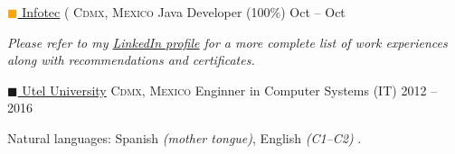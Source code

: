 \documentclass[10pt,a4paper]{article}
\newcommand{\colorsquare}[1]{\textcolor{#1}{$\blacksquare$}}
\begin{document}
\vspace{-1em}

\headedsection
  {\href{https://www.infotec.mx/}{\colorsquare{orange}  Infotec} (}
  {\textsc{Cdmx, Mexico}} {%
  \headedsubsection
    {Java Developer (100\%)}
    {Oct  -- Oct }
    {}
}

\vspace{-0.2em}
\begin{center}
  \emph{\small Please refer to my \href{http://www.linkedin.com/in/sergio-martinez-b70a79177}{LinkedIn profile} for a more complete list of work experiences along with recommendations and certificates.}
\end{center}

\spacedhrule{-0.2em}{-0.4em}


\headedsection
  {\href{https://uteluniversidad.mx/p/utel-formacion?msclkid=1eb53b5cf61218f895775f4eda7ce02f}{\colorsquare{brickred} Utel University}}
  {\textsc{Cdmx, Mexico}} {%
  \headedsubsection
    {Enginner in Computer Systems (IT)}
    {2012 -- 2016}
    {%
    }
}



\spacedhrule{0.5em}{-0.4em}



\vspace{0.5em}
\inlineheadsection
  {Natural languages:}
  {Spanish \emph{(mother tongue)}, English \emph{(C1--C2)} \emph{}.
  }

\end{document}
